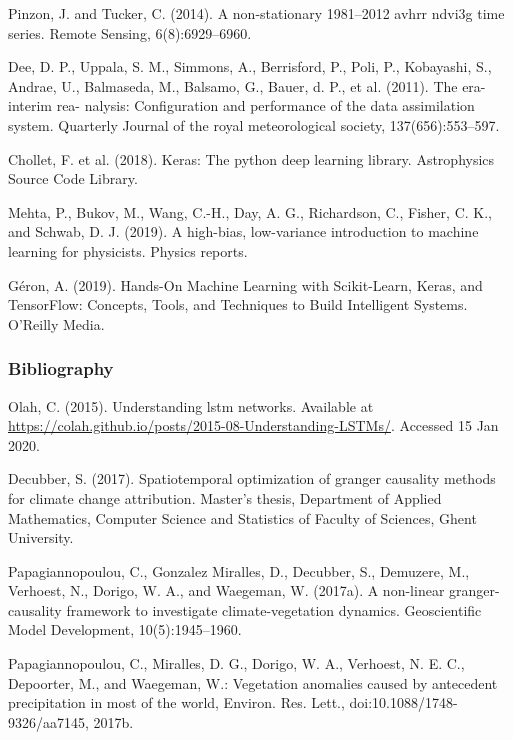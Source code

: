 \documentclass[11pt]{beamer}
\begin{document}
\begin{thebibliography}{99}
\begin{frame}
{    \bibitem{}
      Pinzon, J. and Tucker, C. (2014). A non-stationary 1981–2012 avhrr ndvi3g
      time series. Remote Sensing, 6(8):6929–6960. 

    \bibitem{}
      Dee, D. P., Uppala, S. M., Simmons, A., Berrisford, P., Poli, P.,
      Kobayashi, S., Andrae, U., Balmaseda, M., Balsamo, G., Bauer, d. P., et
      al. (2011). The era-interim rea- nalysis: Configuration and performance of
      the data assimilation system. Quarterly Journal of the royal
      meteorological society, 137(656):553–597.
      
    \bibitem{}
      Chollet, F. et al. (2018). Keras: The python deep learning
      library. Astrophysics Source Code Library.
      
    \bibitem{}
      Mehta, P., Bukov, M., Wang, C.-H., Day, A. G., Richardson, C., Fisher,
      C. K., and Schwab, D. J. (2019). A high-bias, low-variance introduction to
      machine learning for physicists. Physics reports.

    \bibitem{}
      Géron, A. (2019). Hands-On Machine Learning with Scikit-Learn, Keras, and
      TensorFlow: Concepts, Tools, and Techniques to Build Intelligent
      Systems. O’Reilly Media.
      
    } 

  \end{frame}

  \begin{frame}
    \frametitle{\normalsize{\textbf{
          Bibliography 
    }}}

    \scriptsize{
      
    \bibitem{}
      Olah, C. (2015). Understanding lstm networks. Available at
      \url{https://colah.github.io/posts/2015-08-Understanding-LSTMs/}. Accessed
      15 Jan 2020.
      
    \bibitem{}
      Decubber, S. (2017). Spatiotemporal optimization of granger causality
      methods for climate change attribution. Master’s thesis, Department of
      Applied Mathematics, Computer Science and Statistics of Faculty of
      Sciences, Ghent University. 
      
    \bibitem{}
      Papagiannopoulou, C., Gonzalez Miralles, D., Decubber, S., Demuzere, M.,
      Verhoest, N., Dorigo, W. A., and Waegeman, W. (2017a). A non-linear
      granger-causality framework to investigate climate-vegetation
      dynamics. Geoscientific Model Development, 10(5):1945–1960. 
 
    \bibitem{}
      Papagiannopoulou, C., Miralles, D. G., Dorigo, W. A., Verhoest, N. E. C.,
      Depoorter, M., and Waegeman, W.: Vegetation anomalies caused by antecedent
      precipitation in most of the world, Environ. Res. Lett.,
      doi:10.1088/1748-9326/aa7145, 2017b. 

}
\end{frame}
\end{thebibliography}
\end{document}
